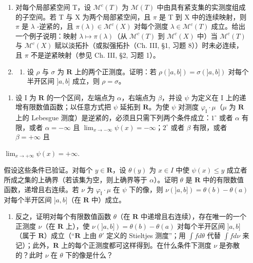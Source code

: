 \begin{enumerate}
\def\labelenumi{\arabic{enumi})}
\setcounter{enumi}{3}
\item
  对每个局部紧空间 T，设 \(\mathcal{M}^{c}(T)\) 为 \(\mathcal{M}(T)\) 中由具有紧支集的实测度组成的子空间。若 T 与 X 为两个局部紧空间，且 \(\pi\) 是 T 到 X 中的连续映射，则 \(\pi\) 是 \(\lambda\) -逆紧的，且 \(\pi(\lambda) \in \mathcal{M}^{c}(X)\) 对每个测度 \(\lambda \in \mathcal{M}^{c}(T)\) 成立。给出一个例子说明：映射 \(\lambda \mapsto \pi(\lambda)\)（从 \(\mathcal{M}^{c}(T)\) 到 \(\mathcal{M}^{c}(X)\) 中）当 \(\mathcal{M}^{c}(T)\) 与 \(\mathcal{M}^{c}(X)\) 赋以淡拓扑（或拟强拓扑（Ch. III, §1, 习题 8））时未必连续，且 \(\pi\) 不是逆紧映射（参见 Ch. III, §2, 习题 1）。
\item
  \begin{enumerate}
  \def\labelenumii{\alph{enumii})}
  \tightlist
  \item
    设 \(\rho\) 与 \(\sigma\) 为 \(\mathbf{R}\) 上的两个正测度。证明：若 \(\rho(]a,b]) = \sigma(]a,b])\) 对每个半开区间 \(]a,b]\) 成立，则 \(\rho = \sigma\)。
  \end{enumerate}
\end{enumerate}

\begin{enumerate}
\def\labelenumi{\alph{enumi})}
\setcounter{enumi}{1}
\tightlist
\item
  设 I 为 \(\mathbf{R}\) 的一个区间，左端点为 \(\alpha\)，右端点为 \(\beta\)，并设 \(\psi\) 为定义在 I 上的递增有限数值函数；以任意方式把 \(\psi\) 延拓到 \(\mathbf{R}\)。为使 \(\psi\) 对测度 \(\varphi_{\mathrm{I}} \cdot \mu\)（\(\mu\) 为 \(\mathbf{R}\) 上的 Lebesgue 测度）是逆紧的，必须且只需下列两个条件成立：\(1^{\circ}\) 或者 \(\alpha\) 有限，或者 \(\alpha = -\infty\) 且 \(\lim_{x \to -\infty} \psi(x) = -\infty\)；\(2^{\circ}\) 或者 \(\beta\) 有限，或者 \(\beta = +\infty\) 且
\end{enumerate}

\(\lim_{x\to +\infty}\psi (x) = +\infty .\)

假设这些条件已验证。对每个 \(y \in \mathbf{R}\)，设 \(\theta(y)\) 为 \(x \in I\) 中使 \(\psi(x) \leqslant y\) 成立者所成之集的上确界（若该集为空，则上确界等于 \(\alpha\)）。证明 \(\theta\) 是 \(\mathbf{R}\) 中的有限数值函数，递增且右连续。若 \(\nu\) 为 \(\varphi_{\mathrm{I}} \cdot \mu\) 在 \(\psi\) 下的像，则 \(\nu(]a,b]) = \theta(b) - \theta(a)\) 对每个半开区间 \(]a,b]\)（在 \(\mathbf{R}\) 中）成立。

\begin{enumerate}
\def\labelenumi{\alph{enumi})}
\setcounter{enumi}{2}
\tightlist
\item
  反之，证明对每个有限数值函数 \(\theta\)（在 \(\mathbf{R}\) 中递增且右连续），存在唯一的一个正测度 \(\nu\)（在 \(\mathbf{R}\) 上），使 \(\nu(]a,b]) = \theta(b) - \theta(a)\) 对每个半开区间 \(]a,b]\)（属于 \(\mathbf{R}\)）成立（“\(\mathbf{R}\) 上由 \(\theta'\) 定义的 Stieltjes 测度”；用 \(\int f d\theta\) 代替 \(\int f d\nu\) 来记）；此外，\(\mathbf{R}\) 上的每个正测度都可这样得到。在什么条件下测度 \(\nu\) 是弥散的？此时 \(\nu\) 在 \(\theta\) 下的像是什么？
\end{enumerate}

